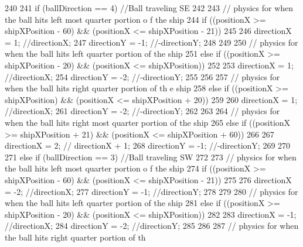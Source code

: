 \begin{DoxyCode}
{{{{240 
241                 if (ballDirection == 4)     //Ball traveling SE
242                 {
243                     // physics for when the ball hits left most quarter portion o
      f the ship
244                     if ((positionX >= shipXPosition - 60) && (positionX <= 
      shipXPosition - 21))
245                     {
246                         directionX = 1;     //directionX;
247                         directionY = -1;    //-directionY;
248                     }
249 
250                     // physics for when the ball hits left quarter portion of the
       ship
251                     else if ((positionX >= shipXPosition - 20) && (positionX <= 
      shipXPosition))
252                     {
253                         directionX = 1;     //directionX;
254                         directionY = -2;    //-directionY;
255                     }
256 
257                     // physics for when the ball hits right quarter portion of th
      e ship
258                     else if ((positionX >= shipXPosition) && (positionX <= 
      shipXPosition + 20))
259                     {
260                         directionX = 1;     //directionX;
261                         directionY = -2;    //-directionY;
262                     }
263 
264                     // physics for when the ball hits right most quarter portion 
      of the ship
265                     else if ((positionX >= shipXPosition + 21) && (positionX <= 
      shipXPosition + 60))
266                     {
267                         directionX = 2;     // directionX + 1;
268                         directionY = -1;    //-directionY;
269                     }
270                 }
271                 else if (ballDirection == 3) //Ball traveling SW
272                 {
273                     // physics for when the ball hits left most quarter portion o
      f the ship
274                     if ((positionX >= shipXPosition - 60) && (positionX <= 
      shipXPosition - 21))
275                     {
276                         directionX = -2;    //directionX;
277                         directionY = -1;    //directionY;
278                     }
279 
280                     // physics for when the ball hits left quarter portion of the
       ship
281                     else if ((positionX >= shipXPosition - 20) && (positionX <= 
      shipXPosition))
282                     {
283                         directionX = -1;    //directionX;
284                         directionY = -2;    //directionY;
285                     }
286 
287                     // physics for when the ball hits right quarter portion of th
}}}}}
\end{DoxyCode}
